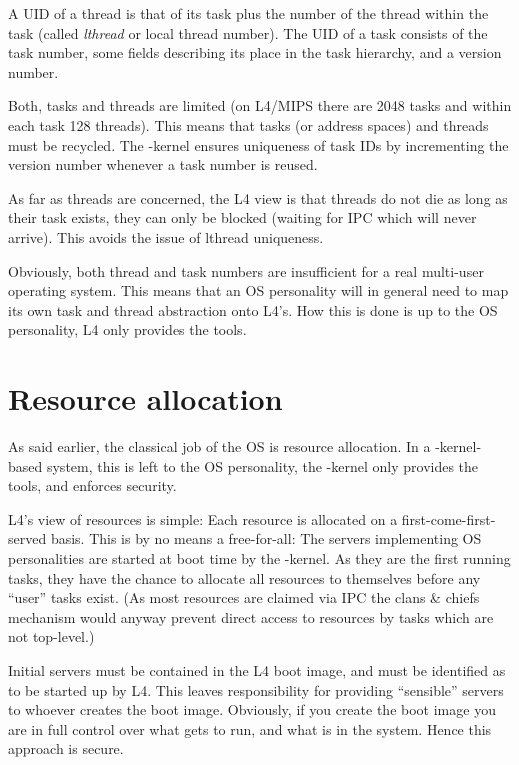 A UID of a thread is that of its task plus the number of the thread
within the task (called \emph{lthread} or local thread number). The UID
of a task consists of the task number, some fields describing its place
in the task hierarchy, and a version number.

Both, tasks and threads are limited (on L4/MIPS there are 2048 tasks and
within each task 128 threads). This means that tasks (or address spaces)
and threads must be recycled. The \micro-kernel ensures uniqueness of
task IDs by incrementing the version number whenever a task number is
reused.

As far as threads are concerned, the L4 view is that threads do not die
as long as their task exists, they can only be blocked (waiting for IPC
which will never arrive). This avoids the issue of lthread uniqueness.

Obviously, both thread and task numbers are insufficient for a real
multi-user operating system. This means that an OS personality will in
general need to map its own task and thread abstraction onto L4's. How
this is done is up to the OS personality, L4 only provides the tools.



\section{Resource allocation}

As said earlier, the classical job of the OS is resource allocation. In
a \micro-kernel-based system, this is left to the OS personality, the
\micro-kernel only provides the tools, and enforces security.

L4's view of resources is simple: Each resource is allocated on a
first-come-first-served basis. This is by no means a free-for-all: The
servers implementing OS personalities are started at boot time by the
\micro-kernel. As they are the first running tasks, they have the chance
to allocate all resources to themselves before any ``user'' tasks
exist. (As most resources are claimed via IPC the clans \& chiefs
mechanism would anyway prevent direct access to resources by tasks which
are not top-level.)

Initial servers must be contained in the L4 boot image, and must be
identified as to be started up by L4. This leaves responsibility for
providing ``sensible'' servers to whoever creates the boot
image. Obviously, if you create the boot image you are in full control
over what gets to run, and what is in the system. Hence this approach is
secure.

